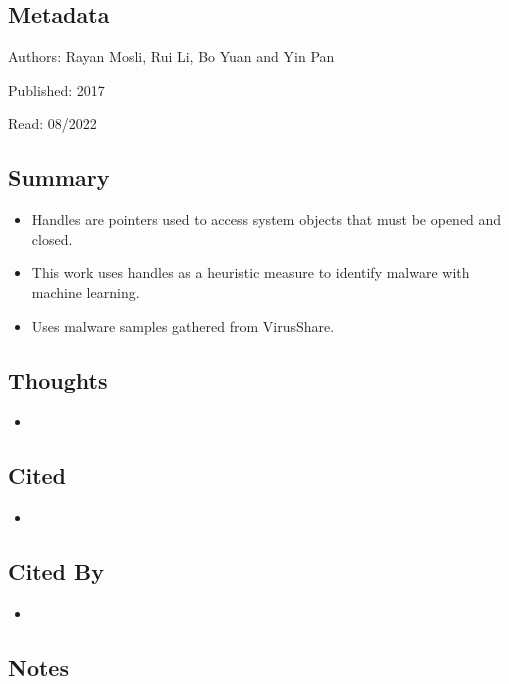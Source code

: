 \documentclass{article}
\begin{document}
\subsection*{Metadata}

\noindent Authors: Rayan Mosli, Rui Li, Bo Yuan and Yin Pan

\noindent Published: 2017

\noindent Read: 08/2022

\subsection*{Summary}
\begin{itemize}
\item Handles are pointers used to access system objects that must be opened and closed.
\item This work uses handles as a heuristic measure to identify malware with machine learning.
\item Uses malware samples gathered from VirusShare.
\end{itemize}

\subsection*{Thoughts}
\begin{itemize}
\item
\end{itemize}

\subsection*{Cited}
\begin{itemize}
\item
\end{itemize}

\subsection*{Cited By}
\begin{itemize}
\item
\end{itemize}

\subsection*{Notes}
\end{document}
